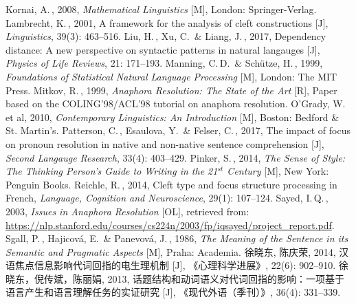 \begin{thebibliography}{99}
	Kornai, A.\,, 2008, \emph{Mathematical Linguistics} [M], London: Springer-Verlag. 
	Lambrecht, K.\,, 2001, A framework for the analysis of cleft constructions [J], \emph{Linguistics}, 39(3): 463--516.
	Liu, H.\,, Xu, C.\, \& Liang, J.\,, 2017, Dependency distance: A new perspective on syntactic patterns in natural langauges [J], \emph{Physics of Life Reviews}, 21: 171--193.
	Manning, C.\,D.\, \& Sch\"{u}tze, H.\,, 1999, \emph{Foundations of Statistical Natural Language Processing} [M], London: The MIT Press. 
	Mitkov, R.\,, 1999, \emph{Anaphora Resolution: The State of the Art} [R], Paper based on the COLING'98/ACL'98 tutorial on anaphora resolution.
	O'Grady, W.\, et al, 2010, \emph{Contemporary Linguistics: An Introduction} [M], Boston: Bedford \& St. Martin's.
	Patterson, C.\,, Esaulova, Y.\, \& Felser, C.\,, 2017, The impact of focus on pronoun resolution in native and non-native sentence comprehension [J], \emph{Second Langauge Research}, 33(4): 403--429.
	Pinker, S.\,, 2014, \emph{The Sense of Style: The Thinking Person's Guide to Writing in the 21$^{st}$ Century} [M], New York: Penguin Books.
	Reichle, R.\,, 2014, Cleft type and focus structure processing in French, \emph{Language, Cognition and Neuroscience}, 29(1): 107--124.
	Sayed, I.\,Q.\,, 2003, \emph{Issues in Anaphora Resolution} [OL], retrieved from: \url{https://nlp.stanford.edu/courses/cs224n/2003/fp/iqsayed/project_report.pdf}.
	Sgall, P.\,, Hajicová, E.\, \& Panevová, J.\,, 1986, \emph{The Meaning of the Sentence in its Semantic and Pragmatic Aspects} [M], Praha: Academia.
	徐晓东, 陈庆荣, 2014, 汉语焦点信息影响代词回指的电生理机制 [J], 《心理科学进展》, 22(6): 902--910.
	徐晓东，倪传斌，陈丽娟, 2013, 话题结构和动词语义对代词回指的影响：一项基于语言产生和语言理解任务的实证研究 [J], 《现代外语（季刊）》, 36(4): 331--339. 
\end{thebibliography}
